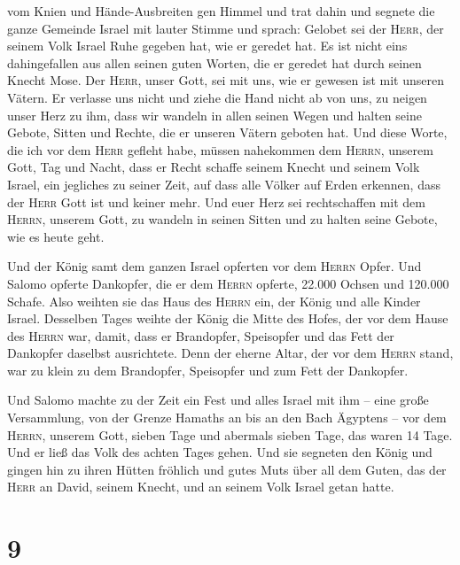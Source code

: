 vom Knien und Hände-Ausbreiten gen Himmel  und trat dahin
und segnete die ganze Gemeinde Israel mit lauter Stimme und sprach:
 Gelobet sei der \textsc{Herr}, der seinem Volk Israel
Ruhe gegeben hat, wie er geredet hat. Es ist nicht eins dahingefallen
aus allen seinen guten Worten, die er geredet hat durch seinen Knecht
Mose.  Der \textsc{Herr}, unser Gott, sei mit uns, wie er
gewesen ist mit unseren Vätern. Er verlasse uns nicht und ziehe die Hand
nicht ab von uns,  zu neigen unser Herz zu ihm, dass wir
wandeln in allen seinen Wegen und halten seine Gebote, Sitten und
Rechte, die er unseren Vätern geboten hat.  Und diese
Worte, die ich vor dem \textsc{Herr} gefleht habe, müssen nahekommen dem
\textsc{Herrn}, unserem Gott, Tag und Nacht, dass er Recht schaffe
seinem Knecht und seinem Volk Israel, ein jegliches zu seiner Zeit,
 auf dass alle Völker auf Erden erkennen, dass der
\textsc{Herr} Gott ist und keiner mehr.  Und euer Herz
sei rechtschaffen mit dem \textsc{Herrn}, unserem Gott, zu wandeln in
seinen Sitten und zu halten seine Gebote, wie es heute geht.

 Und der König samt dem ganzen Israel opferten vor dem
\textsc{Herrn} Opfer.  Und Salomo opferte Dankopfer, die
er dem \textsc{Herrn} opferte, 22.000 Ochsen und 120.000 Schafe. Also
weihten sie das Haus des \textsc{Herrn} ein, der König und alle Kinder
Israel.  Desselben Tages weihte der König die Mitte des
Hofes, der vor dem Hause des \textsc{Herrn} war, damit, dass er
Brandopfer, Speisopfer und das Fett der Dankopfer daselbst ausrichtete.
Denn der eherne Altar, der vor dem \textsc{Herrn} stand, war zu klein zu
dem Brandopfer, Speisopfer und zum Fett der Dankopfer.

 Und Salomo machte zu der Zeit ein Fest und alles Israel
mit ihm -- eine große Versammlung, von der Grenze Hamaths an bis an den
Bach Ägyptens -- vor dem \textsc{Herrn}, unserem Gott, sieben Tage und
abermals sieben Tage, das waren 14 Tage.  Und er ließ das
Volk des achten Tages gehen. Und sie segneten den König und gingen hin
zu ihren Hütten fröhlich und gutes Muts über all dem Guten, das der
\textsc{Herr} an David, seinem Knecht, und an seinem Volk Israel getan
hatte.

\hypertarget{section-8}{%
\section{9}\label{section-8}}

